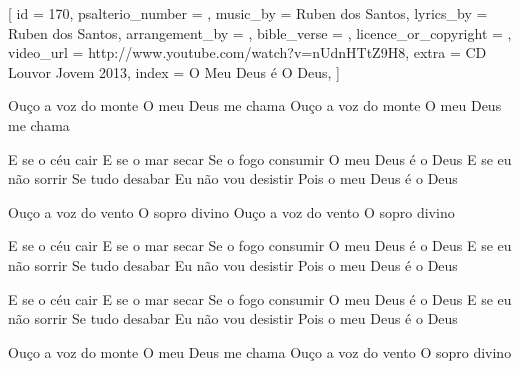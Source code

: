 
[
    id                     = {170},
    psalterio_number       = {},
    music_by               = {Ruben dos Santos},
    lyrics_by              = {Ruben dos Santos},
    arrangement_by         = {},
    bible_verse            = {},
    licence_or_copyright   = {},
    video_url              = {http://www.youtube.com/watch?v=nUdnHTtZ9H8},
    extra                  = {CD Louvor Jovem 2013},
    index                  = {O Meu Deus é O Deus},
]

\beginverse
Ouço a voz do monte
O meu Deus me chama
Ouço a voz do monte
O meu Deus me chama
\endverse


\beginchorus
E se o céu cair
E se o mar secar
Se o fogo consumir
O meu Deus é o Deus
E se eu não sorrir
Se tudo desabar
Eu não vou desistir
Pois o meu Deus é o Deus
\endchorus


\beginverse
Ouço a voz do vento
O sopro divino
Ouço a voz do vento
O sopro divino
\endverse


\beginchorus
E se o céu cair
E se o mar secar
Se o fogo consumir
O meu Deus é o Deus
E se eu não sorrir
Se tudo desabar
Eu não vou desistir
Pois o meu Deus é o Deus
\endchorus


\beginchorus
E se o céu cair
E se o mar secar
Se o fogo consumir
O meu Deus é o Deus
E se eu não sorrir
Se tudo desabar
Eu não vou desistir
Pois o meu Deus é o Deus
\endchorus


\beginverse
Ouço a voz do monte
O meu Deus me chama
Ouço a voz do vento
O sopro divino
\endverse

\endsong
